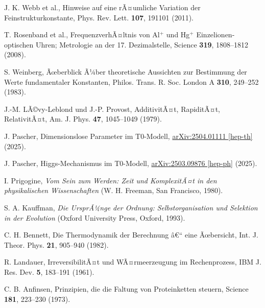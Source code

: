 ﻿\documentclass[twocolumn,aps,prl]{revtex4-2}
\begin{document}
{{{{{{{{{{{{{{{{\begin{thebibliography}{99}
																				 J. K. Webb et al., Hinweise auf eine rÃ¤umliche Variation der Feinstrukturkonstante, Phys. Rev. Lett. \textbf{107}, 191101 (2011).
																				
																				 T. Rosenband et al., FrequenzverhÃ¤ltnis von Al$^+$ und Hg$^+$ Einzelionen-optischen Uhren; Metrologie an der 17. Dezimalstelle, Science \textbf{319}, 1808--1812 (2008).
																				
																				 S. Weinberg, Ãœberblick Ã¼ber theoretische Aussichten zur Bestimmung der Werte fundamentaler Konstanten, Philos. Trans. R. Soc. London A \textbf{310}, 249--252 (1983).
																				
																				 J.-M. LÃ©vy-Leblond und J.-P. Provost, AdditivitÃ¤t, RapiditÃ¤t, RelativitÃ¤t, Am. J. Phys. \textbf{47}, 1045--1049 (1979).
																				
																				 J. Pascher, Dimensionslose Parameter im T0-Modell, \href{https://github.com/jpascher/T0-Time-Mass-Duality/tree/main/2/pdf/Deutsch/DimensionsloseParameterT0.pdf}{arXiv:2504.01111 [hep-th]} (2025).
																				
																				 J. Pascher, Higgs-Mechanismus im T0-Modell, \href{https://github.com/jpascher/T0-Time-Mass-Duality/tree/main/2/pdf/Deutsch/HiggsT0.pdf}{arXiv:2503.09876 [hep-ph]} (2025).
																				
																				 I. Prigogine, \textit{Vom Sein zum Werden: Zeit und KomplexitÃ¤t in den physikalischen Wissenschaften} (W. H. Freeman, San Francisco, 1980).
																				
																				 S. A. Kauffman, \textit{Die UrsprÃ¼nge der Ordnung: Selbstorganisation und Selektion in der Evolution} (Oxford University Press, Oxford, 1993).
																				
																				 C. H. Bennett, Die Thermodynamik der Berechnung â€“ eine Ãœbersicht, Int. J. Theor. Phys. \textbf{21}, 905--940 (1982).
																				
																				 R. Landauer, IrreversibilitÃ¤t und WÃ¤rmeerzeugung im Rechenprozess, IBM J. Res. Dev. \textbf{5}, 183--191 (1961).
																				
																				 C. B. Anfinsen, Prinzipien, die die Faltung von Proteinketten steuern, Science \textbf{181}, 223--230 (1973).
																				

\end{thebibliography}}}}}}}}}}}}}}}}}
\end{document}
